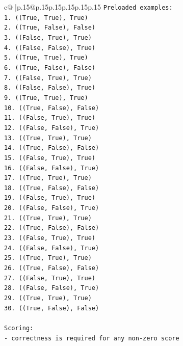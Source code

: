 \documentclass{article}
\begin{document}
{\begin{supertabular}{c@{$\;$}|p{.15\linewidth}@{}p{.15\linewidth}p{.15\linewidth}p{.15\linewidth}p{.15\linewidth}p{.15\linewidth}}
{{{\texttt{Preloaded examples:} \\
\texttt{1. ((True, True), True)} \\
\texttt{2. ((True, False), False)} \\
\texttt{3. ((False, True), True)} \\
\texttt{4. ((False, False), True)} \\
\texttt{5. ((True, True), True)} \\
\texttt{6. ((True, False), False)} \\
\texttt{7. ((False, True), True)} \\
\texttt{8. ((False, False), True)} \\
\texttt{9. ((True, True), True)} \\
\texttt{10. ((True, False), False)} \\
\texttt{11. ((False, True), True)} \\
\texttt{12. ((False, False), True)} \\
\texttt{13. ((True, True), True)} \\
\texttt{14. ((True, False), False)} \\
\texttt{15. ((False, True), True)} \\
\texttt{16. ((False, False), True)} \\
\texttt{17. ((True, True), True)} \\
\texttt{18. ((True, False), False)} \\
\texttt{19. ((False, True), True)} \\
\texttt{20. ((False, False), True)} \\
\texttt{21. ((True, True), True)} \\
\texttt{22. ((True, False), False)} \\
\texttt{23. ((False, True), True)} \\
\texttt{24. ((False, False), True)} \\
\texttt{25. ((True, True), True)} \\
\texttt{26. ((True, False), False)} \\
\texttt{27. ((False, True), True)} \\
\texttt{28. ((False, False), True)} \\
\texttt{29. ((True, True), True)} \\
\texttt{30. ((True, False), False)} \\
\\ 
\texttt{Scoring:} \\
\texttt{{-} correctness is required for any non{-}zero score} \\
}}}
\end{supertabular}}
\end{document}
